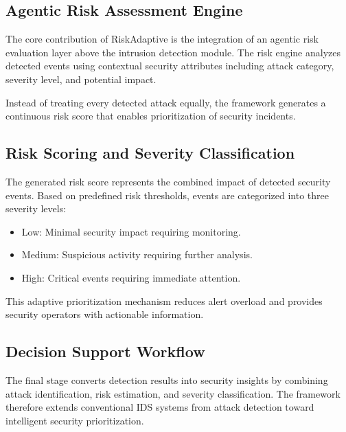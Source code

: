 \subsection{Agentic Risk Assessment Engine}

The core contribution of RiskAdaptive is the integration of an
agentic risk evaluation layer above the intrusion detection module.
The risk engine analyzes detected events using contextual security
attributes including attack category, severity level, and potential
impact.

Instead of treating every detected attack equally, the framework
generates a continuous risk score that enables prioritization of
security incidents.


\subsection{Risk Scoring and Severity Classification}

The generated risk score represents the combined impact of detected
security events. Based on predefined risk thresholds, events are
categorized into three severity levels:

\begin{itemize}
\item Low: Minimal security impact requiring monitoring.
\item Medium: Suspicious activity requiring further analysis.
\item High: Critical events requiring immediate attention.
\end{itemize}

This adaptive prioritization mechanism reduces alert overload and
provides security operators with actionable information.


\subsection{Decision Support Workflow}

The final stage converts detection results into security insights by
combining attack identification, risk estimation, and severity
classification. The framework therefore extends conventional IDS
systems from attack detection toward intelligent security
prioritization.
